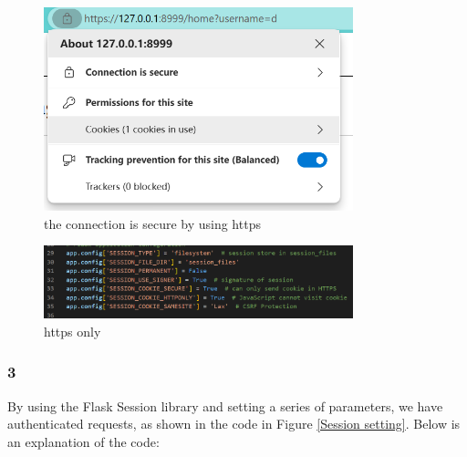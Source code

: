 \documentclass[12pt]{article}
\begin{document}
    	\begin{figure}[H]
            \centering
            \includegraphics[width=0.8\textwidth]{zzrgraphs/connection_is_secure.png}
            \caption{the connection is secure by using https}
    		\label{secureconnection}
        \end{figure}

    	\begin{figure}[H]
            \centering
            \includegraphics[width=0.8\textwidth]{zzrgraphs/cookie_secure_https_only.png}
            \caption{https only}
    		\label{httpsonly}
        \end{figure}


    \subsubsection*{3}

          By using the Flask Session library and setting a series of parameters, we have authenticated requests, as shown in the code in Figure \ref{Session setting}. Below is an explanation of the code:
\end{document}
